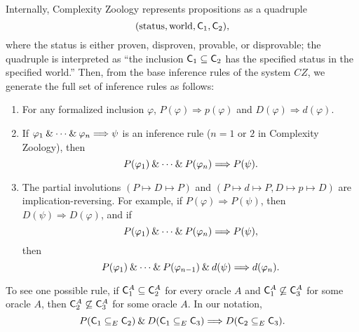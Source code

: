 Internally, Complexity Zoology represents propositions as a quadruple
\[
(\text{status}, \text{world}, \mathsf{C}_1, \mathsf{C}_2),
\]
where the status is either proven, disproven, provable, or disprovable; the
quadruple is interpreted as ``the inclusion $\mathsf{C}_1\subseteq\mathsf{C}_2$ has the
specified status in the specified world.'' Then, from the base inference rules
of the system $CZ$, we generate the full set of inference rules as follows:
\begin{enumerate}
\item For any formalized inclusion $\varphi$, $P(\varphi)\Longrightarrow
  p(\varphi)$ and $D(\varphi)\Longrightarrow d(\varphi)$.
\item If $\varphi_1\mathbin{\&}\cdots\mathbin{\&}\varphi_n\Longrightarrow\psi$ is an
  inference rule ($n=1\text{ or }2$ in Complexity Zoology), then
  \[
  P(\varphi_1)\mathbin{\&}\cdots\mathbin{\&} P(\varphi_n)\Longrightarrow P(\psi).
  \]
\item The partial involutions $(P\mapsto D\mapsto P)$ and
  $(P\mapsto d\mapsto P,D\mapsto p\mapsto D)$ are implication-reversing. For
  example, if $P(\varphi)\Longrightarrow P(\psi)$, then
  $D(\psi)\Longrightarrow D(\varphi)$, and if
  \[
  P(\varphi_1)\mathbin{\&}\cdots\mathbin{\&} P(\varphi_n)\Longrightarrow P(\psi),
  \]
  then
  \[
  P(\varphi_1)\mathbin{\&}\cdots\mathbin{\&} P(\varphi_{n-1})\mathbin{\&} d(\psi)\Longrightarrow 
  d(\varphi_n).
  \]
\end{enumerate}
To see one possible rule, if $\mathsf{C}_1^A\subseteq\mathsf{C}_2^A$ for every oracle $A$ and
$\mathsf{C}_1^A\not\subseteq\mathsf{C}_3^A$ for some oracle $A$, then
$\mathsf{C}_2^A\not\subseteq\mathsf{C}_3^A$ for some oracle $A$. In our notation,
\[
P(\mathsf{C}_1\subseteq_E\mathsf{C}_2)\mathbin{\&} D(\mathsf{C}_1\subseteq_E\mathsf{C}_3)\Longrightarrow
D(\mathsf{C}_2\subseteq_E\mathsf{C}_3).
\]  
